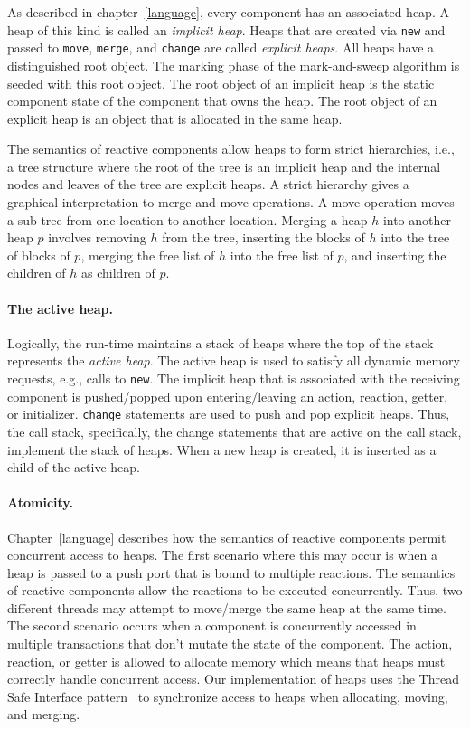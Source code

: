 As described in chapter~\ref{language}, every component has an associated heap.
A heap of this kind is called an \emph{implicit heap}.
Heaps that are created via \verb+new+ and passed to \verb+move+, \verb+merge+, and \verb+change+ are called \emph{explicit heaps}.
All heaps have a distinguished root object.
The marking phase of the mark-and-sweep algorithm is seeded with this root object.
The root object of an implicit heap is the static component state of the component that owns the heap.
The root object of an explicit heap is an object that is allocated in the same heap.

The semantics of reactive components allow heaps to form strict hierarchies, i.e., a tree structure where the root of the tree is an implicit heap and the internal nodes and leaves of the tree are explicit heaps.
A strict hierarchy gives a graphical interpretation to merge and move operations.
A move operation moves a sub-tree from one location to another location.
 Merging a heap $h$ into another heap $p$ involves removing $h$ from the tree, inserting the blocks of $h$ into the tree of blocks of $p$, merging the free list of $h$ into the free list of $p$, and inserting the children of $h$ as children of $p$.

\paragraph{The active heap.}
Logically, the run-time maintains a stack of heaps where the top of the stack represents the \emph{active heap}.
The active heap is used to satisfy all dynamic memory requests, e.g., calls to \verb+new+.
The implicit heap that is associated with the receiving component is pushed/popped upon entering/leaving an action, reaction, getter, or initializer.
\verb+change+ statements are used to push and pop explicit heaps.
Thus, the call stack, specifically, the change statements that are active on the call stack, implement the stack of heaps.
When a new heap is created, it is inserted as a child of the active heap.

\paragraph{Atomicity.}
Chapter~\ref{language} describes how the semantics of reactive components permit concurrent access to heaps.
The first scenario where this may occur is when a heap is passed to a push port that is bound to multiple reactions.
The semantics of reactive components allow the reactions to be executed concurrently.
Thus, two different threads may attempt to move/merge the same heap at the same time.
The second scenario occurs when a component is concurrently accessed in multiple transactions that don't mutate the state of the component.
The action, reaction, or getter is allowed to allocate memory which means that heaps must correctly handle concurrent access.
Our implementation of heaps uses the Thread Safe Interface pattern~\cite{schmidt2000pattern} to synchronize access to heaps when allocating, moving, and merging.

